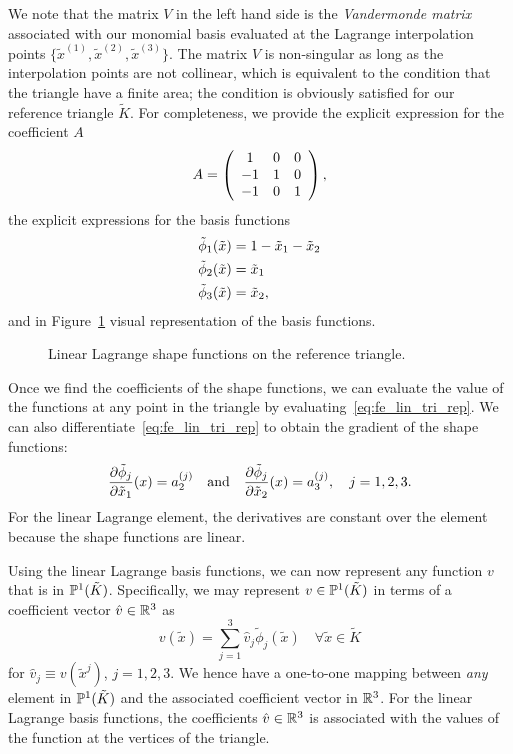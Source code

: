 We note that the matrix $V$ in the left hand side is the \emph{Vandermonde matrix} associated with our monomial basis evaluated at the Lagrange interpolation points $\{\tilde x^{(1)},\tilde x^{(2)}, \tilde x^{(3)}\}$.  The matrix $V$ is non-singular as long as the interpolation points are not collinear, which is equivalent to the condition that the triangle have a finite area; the condition is obviously satisfied for our reference triangle $\tilde K$.  For completeness, we provide the explicit expression for the coefficient $A$
\begin{equation*}
  A = \bmat{ccc}
  1 & 0 & 0\\
  -1 & 1 & 0 \\
  -1 & 0 & 1
  \emat,
\end{equation*}
the explicit expressions for the basis functions
\begin{align}
  \tilde \phi_1(\tilde x) &= 1 - \tilde x_1 - \tilde x_2 \notag \\
  \tilde \phi_2(\tilde x) &= \tilde x_1 \label{eq:fe_lin_tri_expl} \\
  \tilde \phi_3(\tilde x) &= \tilde x_2, \notag
\end{align}
and in Figure~\ref{fig:fe_shape_tri_p1} visual representation of the basis functions.

\begin{figure}
  \centering
  \caption{Linear Lagrange shape functions on the reference triangle.}
  \label{fig:fe_shape_tri_p1}
\end{figure}

Once we find the coefficients of the shape functions, we can evaluate the value of the functions at any point in the triangle by evaluating~\eqref{eq:fe_lin_tri_rep}. We can also differentiate~\eqref{eq:fe_lin_tri_rep} to obtain the gradient of the shape functions:
\begin{align*}
  \pp{\tilde \phi_j}{\tilde x_1}(x) = a_2^{(j)}
  \quad \text{and} \quad
  \pp{\tilde \phi_j}{\tilde x_2}(x) = a_3^{(j)}, \quad j = 1,2,3.
\end{align*}
For the linear Lagrange element, the derivatives are constant over the element because the shape functions are linear.

Using the linear Lagrange basis functions, we can now represent any function $v$ that is in $\PP^1(\tilde K)$.  Specifically, we may represent $v \in \PP^1(\tilde K)$ in terms of a coefficient vector $\hat v \in \RR^3$ as
\begin{equation*}
  v(\tilde x) = \sum_{j=1}^{3} \hat v_j  \tilde \phi_j(\tilde x) \quad \forall \tilde x \in \tilde K
\end{equation*}
for $\hat v_j \equiv v(\tilde x^j)$, $j = 1,2,3$.  We hence have a one-to-one mapping between \emph{any} element in $\PP^1(\tilde K)$ and the associated coefficient vector in $\RR^3$.  For the linear Lagrange basis functions, the coefficients $\hat v \in \RR^3$ is associated with the values of the function at the vertices of the triangle.

